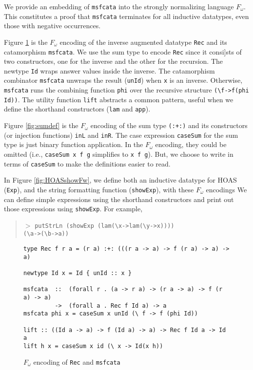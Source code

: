 We provide an embedding of \verb|msfcata|
into the strongly normalizing language $F_\omega$.
This constitutes a proof that \verb|msfcata| terminates for all
inductive datatypes, even those with negative occurrences.

Figure \ref{fig:proofsf} is the $F_\omega$ encoding of the inverse augmented datatype
\verb|Rec| and its catamorphism \verb|msfcata|.  We use the sum type to encode \verb|Rec|
since it consi]sts of two constructors, one for the inverse and the other for
the recursion.  The newtype \verb|Id| wraps answer values inside the inverse.
The catamorphism combinator \verb|msfcata| unwraps
the result (\verb|unId|) when \verb|x| is an inverse.
Otherwise, \texttt{msfcata} runs the combining function \verb|phi| over
the recursive structure \verb|(\f->f(phi Id))|.
The utility function \verb|lift| abstracts a common pattern, useful
when we define the shorthand constructors (\verb|lam| and \verb|app|).

Figure \ref{fig:sumdef} is the $F_\omega$ encoding of the sum type \verb|(:+:)|
and its constructors (or injection functions) \verb|inL| and \verb|inR|.
The case expression \verb|caseSum| for the sum type is just binary function
application. In the $F_\omega$ encoding, they could be omitted
(i.e., \verb|caseSum x f g| simplifies to \verb|x f g|).
But, we choose to write in terms of \verb|caseSum| to make
the definitions easier to read.

In Figure \ref{fig:HOASshowFw}, we define both an inductive datatype for HOAS (\verb|Exp|), and the string formatting function
(\verb|showExp|),
with these $F_\omega$ encodings
We can define simple expressions using the shorthand constructors and print out
those expressions using \verb|showExp|.  For example,
\begin{quote}\noindent
$>$ \verb|putStrLn (showExp (lam(\x->lam(\y->x))))|\\
\verb|(\a->(\b->a))|
\end{quote}

\begin{figure}
\begin{verbatim}
type Rec f r a = (r a) :+: (((r a -> a) -> f (r a) -> a) -> a)

newtype Id x = Id { unId :: x }

msfcata  ::  (forall r . (a -> r a) -> (r a -> a) -> f (r a) -> a)
         ->  (forall a . Rec f Id a) -> a
msfcata phi x = caseSum x unId (\ f -> f (phi Id))

lift :: ((Id a -> a) -> f (Id a) -> a) -> Rec f Id a -> Id a
lift h x = caseSum x id (\ x -> Id(x h))
\end{verbatim}
\caption{$F_\omega$ encoding of \texttt{Rec} and \texttt{msfcata}}
\label{fig:proofsf}
\end{figure}

